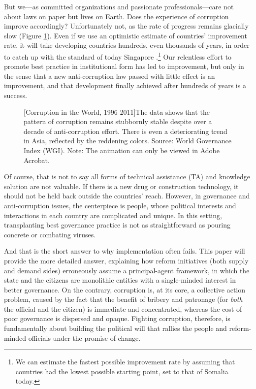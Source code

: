 \documentclass[12pt]{article}
\begin{document}
But we---as committed organizations and passionate professionals---care not about laws on paper but lives on Earth. Does the experience of corruption improve accordingly? Unfortunately not, as the rate of progress remains glacially slow (Figure \ref{fig:worldcorruption}). Even if we use an optimistic estimate of countries' improvement rate, it will take developing countries hundreds, even thousands of years, in order to catch up with the standard of today Singapore \citep{Pritchett2010}.\footnote{We can estimate the fastest possible improvement rate by assuming that countries had the lowest possible starting point, set to that of Somalia today.} Our relentless effort to promote best practice in institutional form has led to improvement, but only in the sense that a new anti-corruption law passed with little effect is an improvement, and that development finally achieved after hundreds of years is a success.

\begin{figure}
\centering
{}
[Corruption in the World, 1996-2011]{The data shows that the pattern of corruption remains stubbornly stable despite over a decade of anti-corruption effort. There is even a deteriorating trend in Asia, reflected by the reddening colors. Source: World Governance Index (WGI). Note: The animation can only be viewed in Adobe Acrobat.}
\label{fig:worldcorruption}
\end{figure}

Of course, that is not to say all forms of technical assistance (TA) and knowledge solution are not valuable. If there is a new drug or construction technology, it should not be held back outside the countries' reach. However, in governance and anti-corruption issues, the centerpiece is people, whose political interests and interactions in each country are complicated and unique. In this setting, transplanting best governance practice is not as straightforward as pouring concrete or combating viruses.

And that is the short answer to why implementation often fails. This paper will provide the more detailed answer, explaining how reform initiatives (both supply and demand sides) erroneously assume a principal-agent framework, in which the state and the citizens are monolithic entities with a single-minded interest in better governance. On the contrary, corruption is, at its core, a collective action problem, caused by the fact that the benefit of bribery and patronage (for \textit{both} the official and the citizen) is immediate and concentrated, whereas the cost of poor governance is dispersed and opaque. Fighting corruption, therefore, is fundamentally about building the political will that rallies the people and reform-minded officials under the promise of change.
\end{document}
